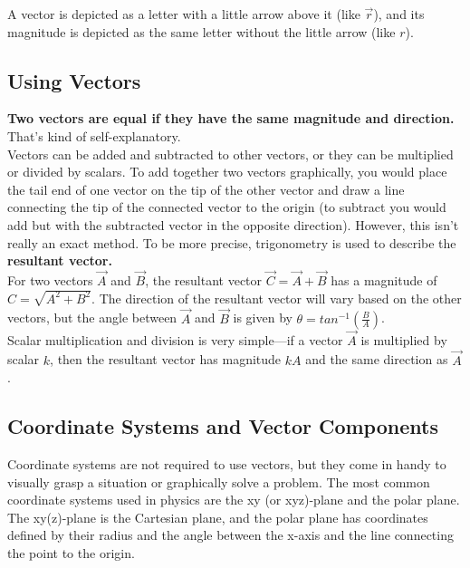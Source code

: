 \documentclass[12pt,letterpaper]{article}
\begin{document}
A vector is depicted as a letter with a little arrow above it (like $\vec{r}$), and its magnitude is depicted as the same letter without the little arrow (like $r$). \\

\subsection[Using Vectors]{Using Vectors}

\textbf{Two vectors are equal if they have the same magnitude and direction.} That's kind of self-explanatory. \\

Vectors can be added and subtracted to other vectors, or they can be multiplied or divided by scalars. To add together two vectors graphically, you would place the tail end of one vector on the tip of the other vector and draw a line connecting the tip of the connected vector to the origin (to subtract you would add but with the subtracted vector in the opposite direction). However, this isn't really an exact method. To be more precise, trigonometry is used to describe the \textbf{resultant vector.} \\

For two vectors $\vec{A}$ and $\vec{B}$, the resultant vector $\vec{C} = \vec{A} + \vec{B}$ has a magnitude of $C = \sqrt{A^{2} + B^{2}}$. The direction of the resultant vector will vary based on the other vectors, but the angle between $\vec{A}$ and $\vec{B}$ is given by $\theta = tan^{-1}(\frac{B}{A})$. \\

Scalar multiplication and division is very simple---if a vector $\vec{A}$ is multiplied by scalar $k$, then the resultant vector has magnitude $kA$ and the same direction as $\vec{A}$.

\subsection[Coordinate Systems and Vector Components]{Coordinate Systems and Vector Components}

Coordinate systems are not required to use vectors, but they come in handy to visually grasp a situation or graphically solve a problem. The most common coordinate systems used in physics are the xy (or xyz)-plane and the polar plane. The xy(z)-plane is the Cartesian plane, and the polar plane has coordinates defined by their radius and the angle between the x-axis and the line connecting the point to the origin. \\
\end{document}
